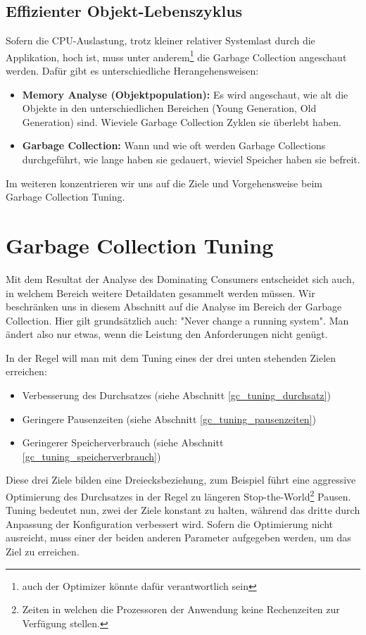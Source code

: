 \subsection{Effizienter Objekt-Lebenszyklus}
Sofern die CPU-Auslastung, trotz kleiner relativer Systemlast durch die Applikation, hoch ist, muss unter anderem\footnote{auch der Optimizer könnte dafür verantwortlich sein} die Garbage Collection angeschaut werden. Dafür gibt es unterschiedliche Herangehensweisen:
\begin{itemize}
\item \textbf{Memory Analyse (Objektpopulation): }Es wird angeschaut, wie alt die Objekte in den unterschiedlichen Bereichen (Young Generation, Old Generation) sind. Wieviele Garbage Collection Zyklen sie überlebt haben.
\item \textbf{Garbage Collection: }Wann und wie oft werden Garbage Collections durchgeführt, wie lange haben sie gedauert, wieviel Speicher haben sie befreit.
\end{itemize}
Im weiteren konzentrieren wir uns auf die Ziele und Vorgehensweise beim Garbage Collection Tuning.

\section{Garbage Collection Tuning}\label{garbage_collection_tuning}
Mit dem Resultat der Analyse des Dominating Consumers entscheidet sich auch, in welchem Bereich weitere Detaildaten gesammelt werden müssen. Wir beschränken uns in diesem Abschnitt auf die Analyse im Bereich der Garbage Collection. Hier gilt grundsätzlich auch: "Never change a running system". Man ändert also nur etwas, wenn die Leistung den Anforderungen nicht genügt. 

In der Regel will man mit dem Tuning eines der drei unten stehenden Zielen erreichen\cite{langerkreftJavaCore}: 
\begin{itemize}
\item Verbesserung des Durchsatzes (siehe Abschnitt \ref{gc_tuning_durchsatz})
\item Geringere Pausenzeiten (siehe Abschnitt \ref{gc_tuning_pausenzeiten})
\item Geringerer Speicherverbrauch (siehe Abschnitt \ref{gc_tuning_speicherverbrauch})
\end{itemize}

Diese drei Ziele bilden eine Dreiecksbeziehung, zum Beispiel führt eine aggressive Optimierung des Durchsatzes in der Regel zu längeren Stop-the-World\footnote{Zeiten in welchen die Prozessoren der Anwendung keine Rechenzeiten zur Verfügung stellen.} Pausen. Tuning bedeutet nun, zwei der Ziele konstant zu halten, während das dritte durch Anpassung der Konfiguration verbessert wird. Sofern die Optimierung nicht ausreicht, muss einer der beiden anderen Parameter aufgegeben werden, um das Ziel zu erreichen.


